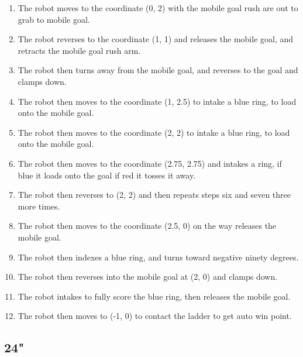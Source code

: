 \begin{enumerate}
    \item     The robot moves to the coordinate (0, 2) with the mobile goal rush are out to grab to mobile goal.
    \item The robot reverses to the coordinate (1, 1) and releases the mobile goal, and retracts the mobile goal rush arm. 
    \item The robot then turns away from the mobile goal, and reverses to the goal and clamps down.
    \item The robot then moves to the coordinate (1, 2.5) to intake a blue ring, to load onto the mobile goal.
    \item The robot then moves to the coordinate (2, 2) to intake a blue ring, to load onto the mobile goal.
    \item The robot then moves to the coordinate (2.75, 2.75) and intakes a ring, if blue it loads onto the goal if red it tosses it away.
    \item The robot then reverses to (2, 2) and then repeats steps six and seven three more times.
    \item The robot then moves to the coordinate (2.5, 0) on the way releases the mobile goal.
    \item The robot then indexes a blue ring, and turns toward negative ninety degrees.
    \item The robot then reverses into the mobile goal at (2, 0) and clamps down.
    \item The robot intakes to fully score the blue ring, then releases the mobile goal.
    \item The robot then moves to (-1, 0) to contact the ladder to get auto win point.
\end{enumerate}

\subsection{24"}

